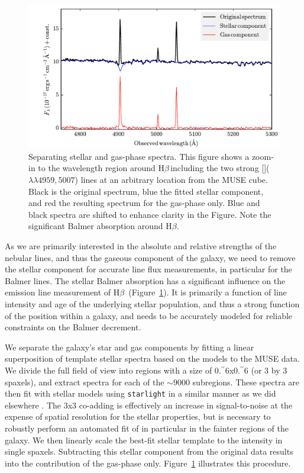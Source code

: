 \documentclass[traditabstract]{aa}
\newcommand{\farc}{\hbox{$.\!\!^{\prime\prime}$}}
\newcommand{\hb}{H$\beta$}
\newcommand{\oiii}{[\ion{O}{iii}]}
\begin{document}
\begin{figure}
\includegraphics[angle=0, width=0.99\columnwidth]{Figs/Stargas_spec.pdf}
\caption{Separating stellar and gas-phase spectra. This figure shows a zoom-in to the wavelength region around \hb\,including the two strong \oiii($\lambda\lambda4959,5007$) lines at an arbitrary location from the MUSE cube. Black is the original spectrum, blue the fitted stellar component, and red the resulting spectrum for the gas-phase only. Blue and black spectra are shifted to enhance clarity in the Figure. Note the significant Balmer absorption around \hb.}
\label{fig:stargas}
\end{figure}

As we are primarily interested in the absolute and relative strengths of the nebular lines, and thus the gaseous component of the galaxy, we need to remove the stellar component for accurate line flux measurements, in particular for the Balmer lines. The stellar Balmer absorption has a significant influence on the emission line measurement of \hb\, (Figure~\ref{fig:stargas}). It is primarily a function of line intensity and age of the underlying stellar population, and thus a strong function of the position within a galaxy, and needs to be accurately modeled for reliable constraints on the Balmer decrement.

We separate the galaxy's star and gas components by fitting a linear superposition of template stellar spectra based on the \citet{2003MNRAS.344.1000B} models to the MUSE data. We divide the full field of view into regions with a size of 0\farc{6}x0\farc{6} (or 3 by 3 spaxels), and extract spectra for each of the $\sim9000$ subregions. These spectra are then fit with stellar models using \texttt{starlight} \citep{2005MNRAS.358..363C, 2009RMxAC..35..127C} in a similar manner as we did elsewhere \citep{2016MNRAS.455.4087G, 2016arXiv160703446K}. The 3x3 co-adding is effectively an increase in signal-to-noise at the expense of spatial resolution for the stellar properties, but is necessary to robustly perform an automated fit of in particular in the fainter regions of the galaxy. We then linearly scale the best-fit stellar template to the intensity in single spaxels. Subtracting this stellar component from the original data results into the contribution of the gas-phase only. Figure~\ref{fig:stargas} illustrates this procedure.
\end{document}
